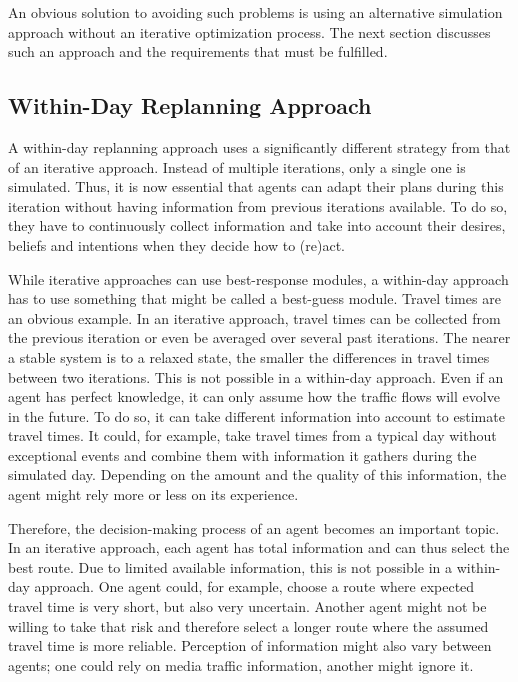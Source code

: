 An obvious solution to avoiding such problems is using an alternative simulation approach without an iterative optimization process. The next section discusses such an approach and the requirements that must be fulfilled.

\subsection{Within-Day Replanning Approach}

A within-day replanning approach uses a significantly different strategy from that of an iterative approach. Instead of multiple iterations, only a single one is simulated. Thus, it is now essential that agents can adapt their plans during this iteration without having information from previous iterations available. To do so, they have to continuously collect information and take into account their desires, beliefs and intentions when they decide how to (re)act.

While iterative approaches can use best-response modules, a within-day approach has to use something that might be called a best-guess module. Travel times are an obvious example. In an iterative approach, travel times can be collected from the previous iteration or even be averaged over several past iterations. The nearer a stable system is to a relaxed state, the smaller the differences in travel times between two iterations. This is not possible in a within-day approach. Even if an agent has perfect knowledge, it can only assume how the traffic flows will evolve in the future. To do so, it can take different information into account to estimate travel times. It could, for example, take travel times from a typical day without exceptional events and combine them with information it gathers during the simulated day. Depending on the amount and the quality of this information, the agent might rely more or less on its experience.

Therefore, the decision-making process of an agent becomes an important topic. In an iterative approach, each agent has total information and can thus select the best route. Due to limited available information, this is not possible in a within-day approach. One agent could, for example, choose a route where expected travel time is very short, but also very uncertain. Another agent might not be willing to take that risk and therefore select a longer route where the assumed travel time is more reliable. Perception of information might also vary between agents; one could rely on media traffic information, another might ignore it.

